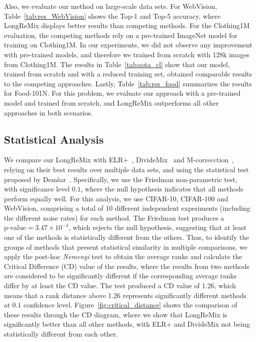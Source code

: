 \documentclass[review]{elsarticle}
\begin{document}
Also, we evaluate our method on large-scale data sets. For WebVision, 
Table~\ref{tab:res_WebVision} shows the Top-1 and Top-5 accuracy, where LongReMix displays better results than competing methods. 
For the Clothing1M evaluation, 
the competing methods rely on a pre-trained ImageNet model for training on Clothing1M. In our experiments, we did not observe any improvement with pre-trained models, and therefore we trained from scratch with 128k images from Clothing1M. The results in Table~\ref{tab:sota_cl} show that our model, trained from scratch and with a reduced training set, obtained comparable results to the competing approaches. Lastly, Table~\ref{tab:res_food} summarizes the results for Food-101N. 
For this problem, we evaluate our approach with a pre-trained model and trained from scratch, and LongReMix outperforms all other approaches in both scenarios.

\subsection{Statistical Analysis}

We compare our LongReMix 
with ELR+~\cite{liu2020early}, DivideMix~\cite{li2020dividemix} and M-correcction~\cite{arazo2019unsupervised}, relying on their best results over multiple data sets, and using the statistical test proposed by Dem{\v{s}}ar~\cite{demvsar2006statistical}.
Specifically, we use the Friedman non-parametric test, with significance level $0.1$, 
where the null hypothesis indicates that
all methods perform equally well.
For this analysis, we use CIFAR-10, CIFAR-100 and WebVision, comprising a total of 10 different independent experiments (including the different noise rates) for each method. 
The Friedman test produces a $\text{p-value}=3.47 \times 10^{-3}$,
which rejects the null hypothesis, suggesting that at least one of the methods is statistically different from the others. 
Thus, to identify the groups of methods that present statistical similarity in multiple comparisons, we apply the post-hoc \textit{Nemenyi} test to obtain the average ranks and calculate the Critical Difference (CD) value of the results, where the results from two methods are considered to be significantly different if the corresponding average
ranks differ by at least the CD value. The test produced a CD value of 1.26, which means that a rank distance above 1.26 represents significantly different methods at $0.1$ confidence level. 
Figure~\ref{fig:critical_distance} shows the comparison of these results through the CD diagram, where we show that LongReMix is significantly better than all other methods, with ELR+ and DivideMix not being statistically different from each other.
\end{document}
